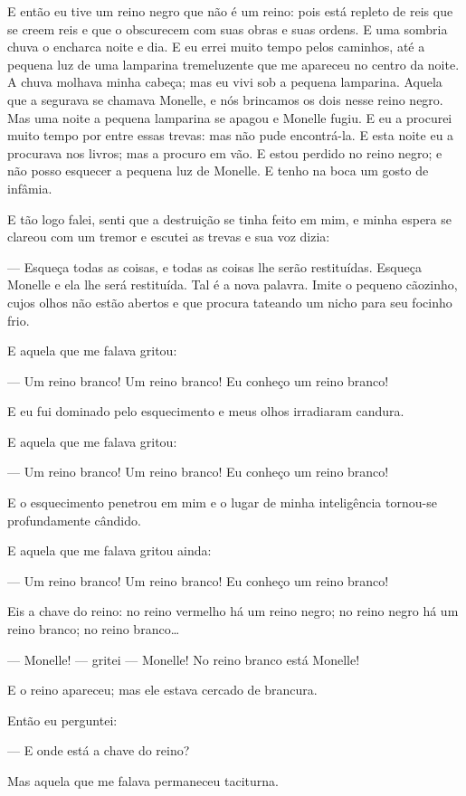 E então eu tive um reino negro que não é um reino: pois está repleto de
reis que se creem reis e que o obscurecem com suas obras e suas ordens. E
uma sombria chuva o encharca noite e dia. E eu errei muito tempo pelos
caminhos, até a pequena luz de uma lamparina tremeluzente que me apareceu no
centro da noite. A chuva molhava minha cabeça; mas eu vivi sob a pequena
lamparina. Aquela que a segurava se chamava Monelle, e nós brincamos os dois
nesse reino negro. Mas uma noite a pequena lamparina se apagou e Monelle
fugiu. E eu a procurei muito tempo por entre essas trevas: mas não pude
encontrá-la. E esta noite eu a procurava nos livros; mas a procuro em vão.
E estou perdido no reino negro; e não posso esquecer a pequena luz de
Monelle. E tenho na boca um gosto de infâmia.

E tão logo falei, senti que a destruição se tinha feito em mim, e minha
espera se clareou com um tremor e escutei as trevas e sua voz dizia:

--- Esqueça todas as coisas, e todas as coisas lhe serão restituídas.
Esqueça Monelle e ela lhe será restituída. Tal é a nova palavra. Imite o
pequeno cãozinho, cujos olhos não estão abertos e que procura tateando um
nicho para seu focinho frio.

E aquela que me falava gritou:

--- Um reino branco! Um reino branco! Eu conheço um reino branco!

E eu fui dominado pelo esquecimento e meus olhos irradiaram candura.

E aquela que me falava gritou:

--- Um reino branco! Um reino branco! Eu conheço um reino branco!

E o esquecimento penetrou em mim e o lugar de minha inteligência
tornou-se profundamente cândido.

E aquela que me falava gritou ainda:

--- Um reino branco! Um reino branco! Eu conheço um reino branco!

Eis a chave do reino: no reino vermelho há um reino negro; no reino
negro há um reino branco; no reino branco\ldots{}

--- Monelle! --- gritei --- Monelle! No reino branco está Monelle!

E o reino apareceu; mas ele estava cercado de \mbox{brancura.}

Então eu perguntei:

--- E onde está a chave do reino?

Mas aquela que me falava permaneceu taciturna.


